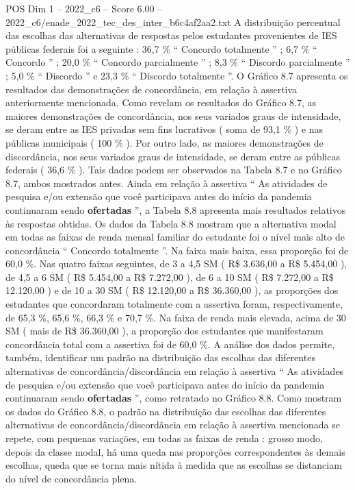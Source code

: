 \begin{textsample}{POS Dim 1 – 2022\_c6 – Score 6.00 – 2022\_c6/enade\_2022\_tec\_des\_inter\_b6c4af2aa2.txt}
A distribuição percentual das escolhas das alternativas de respostas pelos estudantes provenientes de IES públicas federais foi a seguinte : 36,7 \% “ Concordo totalmente ” ; 6,7 \% “ Concordo ” ; 20,0 \% “ Concordo parcialmente ” ; 8,3 \% “ Discordo parcialmente ” ; 5,0 \% “ Discordo ” e 23,3 \% “ Discordo totalmente ”.
O Gráfico 8.7 apresenta os resultados das demonstrações de concordância, em relação à assertiva anteriormente mencionada.
Como revelam os resultados do Gráfico 8.7, as maiores demonstrações de concordância, nos seus variados graus de intensidade, se deram entre as IES privadas sem fins lucrativos ( soma de 93,1 \% ) e nas públicas municipais ( 100 \% ).
Por outro lado, as maiores demonstrações de discordância, nos seus variados graus de intensidade, se deram entre as públicas federais ( 36,6 \% ).
Tais dados podem ser observados na Tabela 8.7 e no Gráfico 8.7, ambos mostrados antes.
Ainda em relação à assertiva “ As atividades de pesquisa e/ou extensão que você participava antes do início da pandemia continuaram sendo \textbf{ofertadas} ”, a Tabela 8.8 apresenta mais resultados relativos às respostas obtidas.
Os dados da Tabela 8.8 mostram que a alternativa modal em todas as faixas de renda mensal familiar do estudante foi o nível mais alto de concordância “ Concordo totalmente ”.
Na faixa mais baixa, essa proporção foi de 60,0 \%.
Nas quatro faixas seguintes, de 3 a 4,5 SM ( R\$ 3.636,00 a R\$ 5.454,00 ), de 4,5 a 6 SM ( R\$ 5.454,00 a R\$ 7.272,00 ), de 6 a 10 SM ( R\$ 7.272,00 a R\$ 12.120,00 ) e de 10 a 30 SM ( R\$ 12.120,00 a R\$ 36.360,00 ), as proporções dos estudantes que concordaram totalmente com a assertiva foram, respectivamente, de 65,3 \%, 65,6 \%, 66,3 \% e 70,7 \%.
Na faixa de renda mais elevada, acima de 30 SM ( mais de R\$ 36.360,00 ), a proporção dos estudantes que manifestaram concordância total com a assertiva foi de 60,0 \%.
A análise dos dados permite, também, identificar um padrão na distribuição das escolhas das diferentes alternativas de concordância/discordância em relação à assertiva “ As atividades de pesquisa e/ou extensão que você participava antes do início da pandemia continuaram sendo \textbf{ofertadas} ”, como retratado no Gráfico 8.8.
Como mostram os dados do Gráfico 8.8, o padrão na distribuição das escolhas das diferentes alternativas de concordância/discordância em relação à assertiva mencionada se repete, com pequenas variações, em todas as faixas de renda : grosso modo, depois da classe modal, há uma queda nas proporções correspondentes às demais escolhas, queda que se torna mais nítida à medida que as escolhas se distanciam do nível de concordância plena.

\end{textsample}
